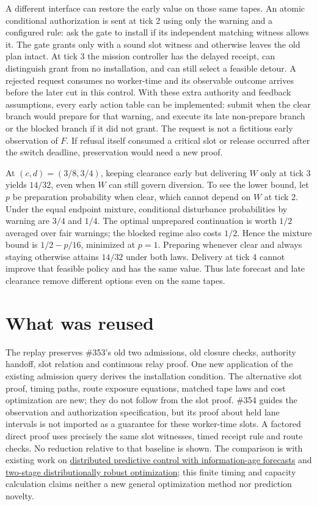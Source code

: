 \documentclass[11pt]{article}
\begin{document}
A different interface can restore the early value on those same tapes. An atomic conditional authorization is sent at tick 2 using only the warning and a configured rule: ask the gate to install if its independent matching witness allows it. The gate grants only with a sound slot witness and otherwise leaves the old plan intact. At tick 3 the mission controller has the delayed receipt, can distinguish grant from no installation, and can still select a feasible detour. A rejected request consumes no worker-time and its observable outcome arrives before the later cut in this control. With these extra authority and feedback assumptions, every early action table can be implemented: submit when the clear branch would prepare for that warning, and execute its late non-prepare branch or the blocked branch if it did not grant. The request is not a fictitious early observation of $F$. If refusal itself consumed a critical slot or release occurred after the switch deadline, preservation would need a new proof.

At $(c,d)=(3/8,3/4)$, keeping clearance early but delivering $W$ only at tick 3 yields $14/32$, even when $W$ can still govern diversion. To see the lower bound, let $p$ be preparation probability when clear, which cannot depend on $W$ at tick 2. Under the equal endpoint mixture, conditional disturbance probabilities by warning are $3/4$ and $1/4$. The optimal unprepared continuation is worth $1/2$ averaged over fair warnings; the blocked regime also costs $1/2$. Hence the mixture bound is $1/2-p/16$, minimized at $p=1$. Preparing whenever clear and always staying otherwise attains $14/32$ under both laws. Delivery at tick 4 cannot improve that feasible policy and has the same value. Thus late forecast and late clearance remove different options even on the same tapes.

\section{What was reused}
The replay preserves \#353's old two admissions, old closure checks, authority handoff, slot relation and continuous relay proof. One new application of the existing admission query derives the installation condition. The alternative slot proof, timing paths, route exposure equations, matched tape laws and cost optimization are new; they do not follow from the slot proof. \#354 guides the observation and authorization specification, but its proof about held lane intervals is not imported as a guarantee for these worker-time slots. A factored direct proof uses precisely the same slot witnesses, timed receipt rule and route checks. No reduction relative to that baseline is shown. The comparison is with existing work on \href{https://arxiv.org/abs/2103.05526}{distributed predictive control with information-age forecasts} and \href{https://doi.org/10.1137/20M1370227}{two-stage distributionally robust optimization}; this finite timing and capacity calculation claims neither a new general optimization method nor prediction novelty.
\end{document}
